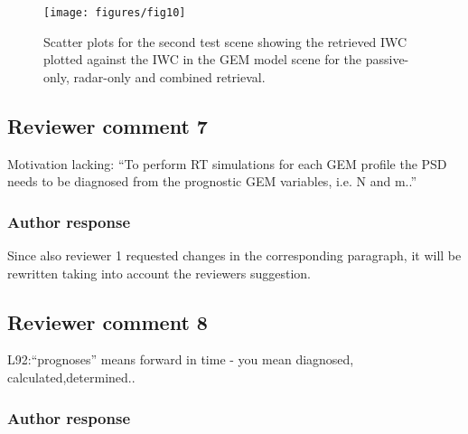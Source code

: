 \documentclass[11pt]{scrartcl}
\begin{document}
\begin{figure}
\centering
\texttt{[image: figures/fig10]}
\caption{Scatter plots for the second test scene showing the
  retrieved IWC plotted against the IWC in the GEM model scene
  for the passive-only, radar-only and combined retrieval.}
\label{fig:retrieval_sketch}
\end{figure}

\subsection*{Reviewer comment 7}

Motivation lacking: “To perform RT simulations for each GEM profile the PSD
needs to be diagnosed from the prognostic GEM variables, i.e. N and m..”

\subsubsection*{Author response}

Since also reviewer 1 requested changes in the corresponding paragraph, it will
be rewritten taking into account the reviewers suggestion.

%



\subsection*{Reviewer comment 8}

L92:“prognoses”   means   forward   in   time   -   you   mean   diagnosed,   calculated,determined..

\subsubsection*{Author response}
\end{document}
